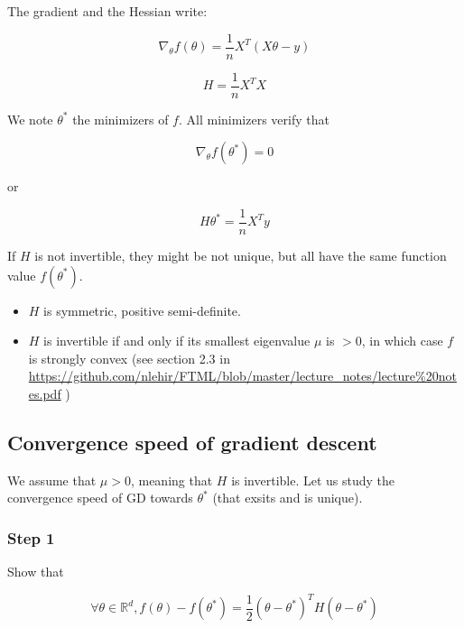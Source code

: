 \documentclass[
10pt, %
a4paper, %
oneside, %
headinclude,footinclude, %
BCOR5mm, %
]{scrartcl}
\begin{document}
    The gradient and the Hessian write:

    \begin{equation}
	\nabla_{\theta}f(\theta) =  \frac{1}{n} X^T(X\theta-y)
    \end{equation}

    \begin{equation}
        H = \frac{1}{n} X^TX
    \end{equation}


    We note $\theta^*$ the minimizers of $f$. All minimizers verify that

    \begin{equation}
	\nabla_{\theta}f(\theta^*) = 0
    \end{equation}

    or

    \begin{equation}
        \label{eq:hessian_star}
        H\theta^* = \frac{1}{n} X^Ty
    \end{equation}

If $H$ is not invertible, they might be not unique, but all have the same function value $f(\theta^*)$.

    \begin{itemize}
    	\item $H$ is symmetric, positive semi-definite.
	\item $H$ is invertible if and only if its smallest eigenvalue $\mu$ is
        $>0$, in which case $f$ is strongly convex (see section 2.3 in \url{https://github.com/nlehir/FTML/blob/master/lecture_notes/lecture%20notes.pdf} )
    \end{itemize}

    \subsection{Convergence speed of gradient descent}

    We assume that $\mu > 0$, meaning that $H$ is invertible. Let us study the convergence speed of GD towards $\theta^*$ (that exsits and is unique).


    \subsubsection{Step 1}%
    \label{ssub:Step 1}
    
    Show that

    \begin{equation}
        \label{eq:taylor}
	\forall \theta \in \mathbb{R}^d, f(\theta)-f(\theta^*) = \frac{1}{2} (\theta-\theta^*)^TH(\theta-\theta^*)
    \end{equation}
\end{document}
